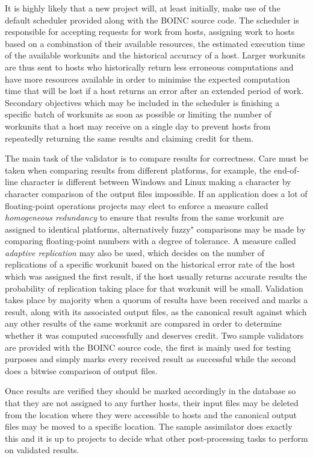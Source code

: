 It is highly likely that a new project will, at least initially, make use of the default scheduler  provided along  with the BOINC source code.
The scheduler is responsible for accepting requests for work from hosts, assigning work to hosts based on a combination of their available resources, the estimated execution time of the available workunits and the historical accuracy of a host. Larger workunits are thus sent to hosts who historically return less erroneous computations and have more resources available in order to minimise the expected computation time that will be lost if a host returns an error after an extended period of   work.
Secondary objectives which may be included in the scheduler is finishing a specific batch of workunits as soon as possible or limiting the number of workunits that a host may receive on a single day to prevent hosts from repeatedly returning the same results and claiming credit for them.

The main task of the validator is to compare results for correctness. Care must be taken when comparing results from different platforms, for example, the end-of-line character is different between Windows and Linux making a character by character comparison of the output files impossible. If an application does a lot of floating-point operations projects may elect to enforce a measure called \emph{homogeneous redundancy} to ensure that results from the same workunit are assigned to identical platforms, alternatively fuzzy" comparisons may be made by comparing floating-point numbers with a degree of tolerance. A measure called \emph{adaptive replication} may also be used, which decides on the number of replications of a specific workunit based on the historical error rate of the host which was assigned the first result, if the host usually returns accurate results the probability of replication taking place for that workunit will be small.
Validation takes place by majority when a quorum of results have been received and marks a result, along with its associated output files, as the canonical result against which any other results of the same workunit are compared in order to determine whether it was computed successfully and deserves credit.
Two sample validators are provided with the BOINC source code, the first is mainly used for testing purposes and simply marks every received result as successful while the second does a bitwise comparison of output files.

Once results are verified they should be marked accordingly in the database so that they are not assigned to any further hosts, their input files may be deleted from the location where they were accessible to hosts and the canonical output files may be moved to a specific location.
The sample assimilator does exactly this and it is up to projects to decide what other post-processing tasks to perform on validated results.

